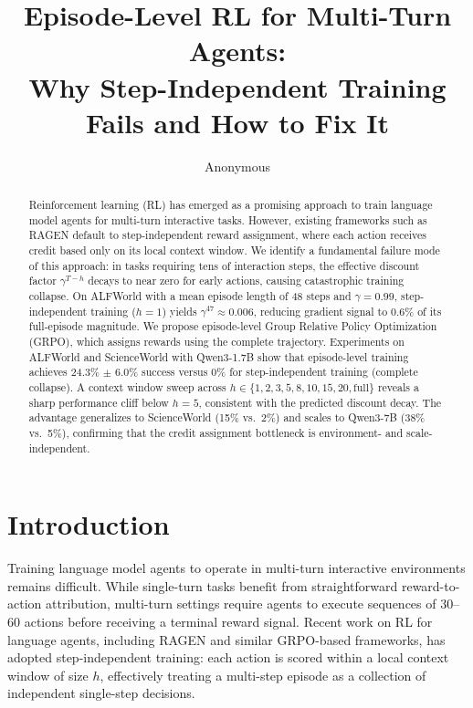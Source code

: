 \documentclass[11pt]{article}
\title{Episode-Level RL for Multi-Turn Agents:\\Why Step-Independent Training Fails and How to Fix It}
\author{Anonymous}
\date{}
\begin{document}
\maketitle

\begin{abstract}
Reinforcement learning (RL) has emerged as a promising approach to train language model agents for multi-turn interactive tasks. However, existing frameworks such as RAGEN default to step-independent reward assignment, where each action receives credit based only on its local context window. We identify a fundamental failure mode of this approach: in tasks requiring tens of interaction steps, the effective discount factor $\gamma^{T-h}$ decays to near zero for early actions, causing catastrophic training collapse. On ALFWorld with a mean episode length of 48 steps and $\gamma=0.99$, step-independent training ($h=1$) yields $\gamma^{47} \approx 0.006$, reducing gradient signal to 0.6\% of its full-episode magnitude. We propose episode-level Group Relative Policy Optimization (GRPO), which assigns rewards using the complete trajectory. Experiments on ALFWorld and ScienceWorld with Qwen3-1.7B show that episode-level training achieves 24.3\% $\pm$ 6.0\% success versus 0\% for step-independent training (complete collapse). A context window sweep across $h \in \{1, 2, 3, 5, 8, 10, 15, 20, \text{full}\}$ reveals a sharp performance cliff below $h=5$, consistent with the predicted discount decay. The advantage generalizes to ScienceWorld (15\% vs.\ 2\%) and scales to Qwen3-7B (38\% vs.\ 5\%), confirming that the credit assignment bottleneck is environment- and scale-independent.
\end{abstract}

\section{Introduction}

Training language model agents to operate in multi-turn interactive environments remains difficult. While single-turn tasks benefit from straightforward reward-to-action attribution, multi-turn settings require agents to execute sequences of 30--60 actions before receiving a terminal reward signal. Recent work on RL for language agents, including RAGEN and similar GRPO-based frameworks, has adopted step-independent training: each action is scored within a local context window of size $h$, effectively treating a multi-step episode as a collection of independent single-step decisions.
\end{document}
